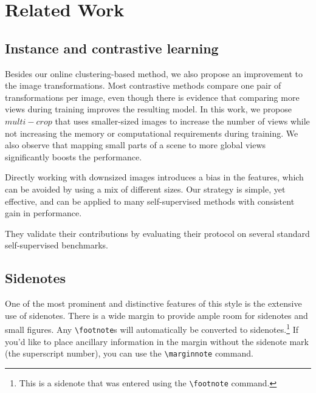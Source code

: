 \documentclass{tufte-handout}
\newcommand{\doccmd}[1]{\texttt{\textbackslash#1}}%
\newenvironment{docspec}{\begin{quote}\noindent}{\end{quote}}%
\begin{document}
\section{Related Work}\label{sec:related-work}
\subsection{Instance and contrastive learning}\label{sec:instance-and-contrastive-learning}

Besides our online clustering-based method, we also propose an improvement to the image transformations.
Most contrastive methods compare one pair of transformations per image, even though there is evidence that comparing more views during training improves the resulting model.
In this work, we propose $multi-crop$ that uses smaller-sized images to increase the number of views while not increasing the memory or computational requirements during training.
We also observe that mapping small parts of a scene to more global views significantly boosts the performance.

Directly working with downsized images introduces a bias in the features, which can be avoided by using a mix of different sizes.
Our strategy is simple, yet effective, and can be applied to many self-supervised methods with consistent gain in performance.

They validate their contributions by evaluating their protocol on several standard self-supervised benchmarks.


\subsection{Sidenotes}\label{sec:sidenotes}
One of the most prominent and distinctive features of this style is the
extensive use of sidenotes.  There is a wide margin to provide ample room
for sidenotes and small figures.  Any \Verb|\footnote|s will automatically
be converted to sidenotes.\footnote{This is a sidenote that was entered
using the \texttt{\textbackslash footnote} command.}  If you'd like to place ancillary
information in the margin without the sidenote mark (the superscript
number), you can use the \Verb|\marginnote| command.
\end{document}
